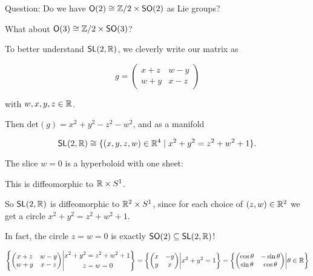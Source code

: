 \documentclass[../main.tex]{subfiles}
\begin{document}

\begin{mdframed}
  Question: Do we have $\mathsf{O}(2) \cong \mathbb{Z} / 2 \times \mathsf{SO}(2)$ as Lie groups?

  What about $\mathsf{O}(3) \cong \mathbb{Z} / 2 \times \mathsf{SO}(3)$?
\end{mdframed}


To better understand $\mathsf{SL}(2, \mathbb{R})$, we cleverly write our matrix as

\[
  g = \begin{pmatrix} x+z & w-y \\ w+y & x-z \end{pmatrix}
\]

with $w,x,y,z \in \mathbb{R}$.

Then $\text{det}(g) = x^2 + y^2 - z^2 - w^2$, and as a manifold

\[
  \mathsf{SL}(2,\mathbb{R}) \cong \{ (x,y,z,w) \in \mathbb{R}^4 \mid x^2 + y^2 = z^2 + w^2 + 1 \}.
\]

The slice $w=0$ is a hyperboloid with one sheet:


This is diffeomorphic to $\mathbb{R} \times S^1$.

So $\mathsf{SL}(2,\mathbb{R})$ is diffeomorphic to $\mathbb{R}^2 \times S^1$, since for each
choice of $(z,w) \in \mathbb{R}^2$ we get a circle $x^2 + y^2 = z^2 + w^2 + 1$. 

In fact, the circle $z=w=0$ is exactly $\mathsf{SO}(2) \subseteq \mathsf{SL}(2, \mathbb{R})$!

\[
\left \{
  \begin{pmatrix}
    x+z & w-y \\ w+y & x-z
  \end{pmatrix}
\middle |
  \begin{aligned}
    x^2 + y^2 &= z^2 + w^2 + 1 \\ z&=w=0
  \end{aligned}
\right \}
=
\left \{ 
  \begin{pmatrix}
    x & -y \\ y & x
  \end{pmatrix}
\middle |
  x^2 + y^2 = 1
\right \}
=
\left \{ 
  \begin{pmatrix}
    \cos \theta & - \sin \theta \\ \sin \theta & \cos \theta
  \end{pmatrix}
\middle |
  \theta \in \mathbb{R}
\right \}
\]
\end{document}

